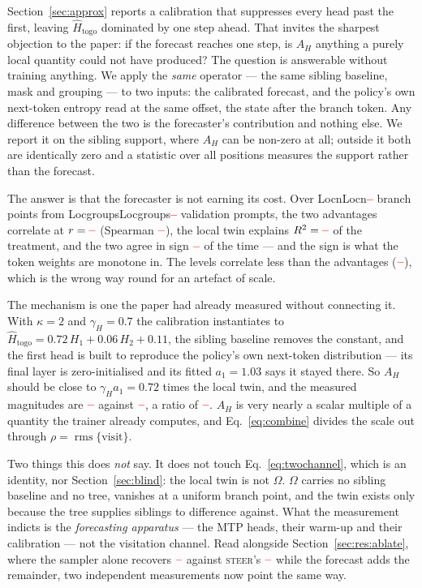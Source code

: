 \documentclass[11pt]{article}
\newcommand{\AH}{A_{H}}
\newcommand{\Om}{\Omega}
\providecommand{\PENDING}{\textcolor{red}{\textbf{--}}}
\newcommand{\num}[1]{\ifcsname #1\endcsname\csname #1\endcsname\else\PENDING\fi}
\begin{document}
Section~\ref{sec:approx} reports a calibration that suppresses every head past
the first, leaving $\hat{H}_{\mathrm{togo}}$ dominated by one step ahead. That
invites the sharpest objection to the paper: if the forecast reaches one step,
is $\AH$ anything a purely local quantity could not have produced? The question
is answerable without training anything. We apply the \emph{same} operator ---
the same sibling baseline, mask and grouping --- to two inputs: the calibrated
forecast, and the policy's own next-token entropy read at the same offset, the
state after the branch token. Any difference between the two is the
forecaster's contribution and nothing else. We report it on the sibling
support, where $\AH$ can be non-zero at all; outside it both are identically
zero and a statistic over all positions measures the support rather than the
forecast.

The answer is that the forecaster is not earning its cost. Over
\num{Locn} branch points from \num{Locgroups} validation prompts, the two
advantages correlate at $r = \num{Locadv}$ (Spearman $\num{Locadvrho}$), the
local twin explains $R^2 = \num{Locrsq}$ of the treatment, and the two agree in
sign $\num{Locsign}$ of the time --- and the sign is what the token weights are
monotone in. The levels correlate less than the advantages
($\num{Loclevels}$), which is the wrong way round for an artefact of scale.

The mechanism is one the paper had already measured without connecting it. With
$\kappa = 2$ and $\gamma_H = 0.7$ the calibration instantiates to
$\hat{H}_{\mathrm{togo}} = 0.72\,H_1 + 0.06\,H_2 + 0.11$, the sibling baseline
removes the constant, and the first head is built to reproduce the policy's own
next-token distribution --- its final layer is zero-initialised and its fitted
$a_1 = 1.03$ says it stayed there. So $\AH$ should be close to
$\gamma_H a_1 = 0.72$ times the local twin, and the measured magnitudes are
$\num{Locahmag}$ against $\num{Locloctwinmag}$, a ratio of $\num{Locratio}$.
$\AH$ is very nearly a scalar multiple of a quantity the trainer already
computes, and Eq.~\eqref{eq:combine} divides the scale out through
$\rho = \operatorname{rms}\{\mathrm{visit}\}$.

Two things this does \emph{not} say. It does not touch
Eq.~\eqref{eq:twochannel}, which is an identity, nor
Section~\ref{sec:blind}: the local twin is not $\Om$. $\Om$ carries no
sibling baseline and no tree, vanishes at a uniform branch point, and the twin
exists only because the tree supplies siblings to difference against. What the
measurement indicts is the \emph{forecasting apparatus} --- the MTP heads,
their warm-up and their calibration --- not the visitation channel. Read
alongside Section~\ref{sec:res:ablate}, where the sampler alone recovers
$\num{Rlamzeroacc}$ against \textsc{steer}'s $\num{Rsteeracc}$ while the
forecast adds the remainder, two independent measurements now point the same
way.
\end{document}
